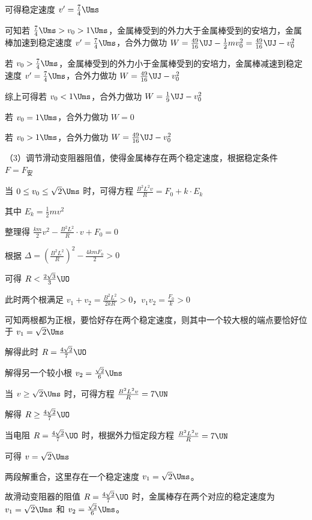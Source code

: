 \documentclass[\gkver]{gaokaozhenti}
\begin{document}
\begin{enumerate}
{可得稳定速度 $v'=\frac{7}{4} \Ums$

可知若 $\frac{7}{4} \Ums>v_{0}>1 \Ums$，金属棒受到的外力大于金属棒受到的安培力，金属棒加速到稳定速度 $v'=\frac{7}{4} \Ums$，合外力做功 $W=\frac{49}{16} \UJ-\frac{1}{2}mv_{0}^{2}=\frac{49}{16} \UJ-v_{0}^{2}$

若 $v_{0}>\frac{7}{4} \Ums$，金属棒受到的外力小于金属棒受到的安培力，金属棒减速到稳定速度 $v'=\frac{7}{4} \Ums$，合外力做功 $W=\frac{49}{16} \UJ-v_{0}^{2}$

综上可得若 $v_{0}<1 \Ums$，合外力做功 $W=\frac{1}{9} \UJ-v_{0}^{2}$

若 $v_{0}=1 \Ums$，合外力做功 $W=0$

若 $v_{0}>1 \Ums$，合外力做功 $W=\frac{49}{16} \UJ-v_{0}^{2}$

（3）调节滑动变阻器阻值，使得金属棒存在两个稳定速度，根据稳定条件 $F=F_{\text{安}}$

当 $0\leq v_{0}\leq\sqrt{2} \Ums$ 时，可得方程 $\frac{B^{2}L^{2}v}{R}=F_{0}+k\cdot E_{k}$

其中 $E_{k}=\frac{1}{2}mv^{2}$

整理得 $\frac{km}{2}v^{2}-\frac{B^{2}L^{2}}{R}\cdot v+F_{0}=0$

根据 $\Delta=\left(\frac{B^{2}L^{2}}{R}\right)^{2}-\frac{4kmF_{0}}{2}>0$

可得 $R<\frac{2\sqrt{3}}{3} \UO$

此时两个根满足 $v_{1}+v_{2}=\frac{B^{2}L^{2}}{2kR}>0$，$v_{1}v_{2}=\frac{F_{0}}{k}>0$

可知两根都为正根，要恰好存在两个稳定速度，则其中一个较大根的端点要恰好位于 $v_{1}=\sqrt{2} \Ums$

解得此时 $R=\frac{4\sqrt{2}}{7} \UO$

解得另一个较小根 $v_{2}=\frac{\sqrt{2}}{6} \Ums$

当 $v\geq\sqrt{2} \Ums$ 时，可得方程 $\frac{B^{2}L^{2}v}{R}=7 \UN$

解得 $R\geq\frac{4\sqrt{2}}{7} \UO$

当电阻 $R=\frac{4\sqrt{2}}{7} \UO$ 时，根据外力恒定段方程 $\frac{B^{2}L^{2}v}{R}=7 \UN$

可得 $v=\sqrt{2} \Ums$

两段解重合，这里存在一个稳定速度 $v_{1}=\sqrt{2} \Ums$。

故滑动变阻器的阻值 $R=\frac{4\sqrt{2}}{7} \UO$ 时，金属棒存在两个对应的稳定速度为 $v_{1}=\sqrt{2} \Ums$ 和 $v_{2}=\frac{\sqrt{2}}{6} \Ums$。
}
\end{enumerate}
\end{document}
